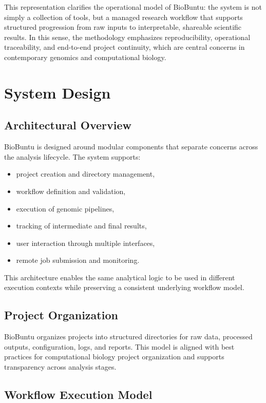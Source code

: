 \documentclass[10pt,conference]{IEEEtran}
\begin{document}
This representation clarifies the operational model of BioBuntu: the system is not simply a collection of tools, but a managed research workflow that supports structured progression from raw inputs to interpretable, shareable scientific results. In this sense, the methodology emphasizes reproducibility, operational traceability, and end-to-end project continuity, which are central concerns in contemporary genomics and computational biology.

\section{System Design}

\subsection{Architectural Overview}

BioBuntu is designed around modular components that separate concerns across the analysis lifecycle. The system supports:

\begin{itemize}[leftmargin=*]
    \item project creation and directory management,
    \item workflow definition and validation,
    \item execution of genomic pipelines,
    \item tracking of intermediate and final results,
    \item user interaction through multiple interfaces,
    \item remote job submission and monitoring.
\end{itemize}

This architecture enables the same analytical logic to be used in different execution contexts while preserving a consistent underlying workflow model.

\subsection{Project Organization}

BioBuntu organizes projects into structured directories for raw data, processed outputs, configuration, logs, and reports. This model is aligned with best practices for computational biology project organization \cite{noble2009bioinformatics} and supports transparency across analysis stages.

\subsection{Workflow Execution Model}
\end{document}
